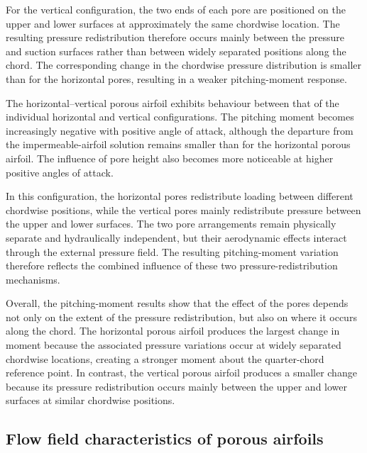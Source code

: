 \documentclass[a4paper,fleqn]{cas-dc}
\begin{document}
	For the vertical configuration, the two ends of each pore are positioned
	on the upper and lower surfaces at approximately the same chordwise
	location. The resulting pressure redistribution therefore occurs mainly
	between the pressure and suction surfaces rather than between widely
	separated positions along the chord. The corresponding change in the chordwise pressure distribution is
	smaller than for the horizontal pores, resulting in a weaker
	pitching-moment response.
	
	The horizontal--vertical porous airfoil exhibits behaviour between that
	of the individual horizontal and vertical configurations. The pitching
	moment becomes increasingly negative with positive angle of attack,
	although the departure from the impermeable-airfoil solution remains
	smaller than for the horizontal porous airfoil. The influence of pore
	height also becomes more noticeable at higher positive angles of attack.
	
	In this configuration, the horizontal pores redistribute loading
	between different chordwise positions, while the vertical pores mainly
	redistribute pressure between the upper and lower surfaces. The two pore
	arrangements remain physically separate and hydraulically independent,
	but their aerodynamic effects interact through the external pressure
	field. The resulting pitching-moment variation therefore reflects the
	combined influence of these two pressure-redistribution mechanisms.
	
	Overall, the pitching-moment results show that the effect of the pores
	depends not only on the extent of the pressure redistribution, but also
	on where it occurs along the chord. The horizontal porous airfoil
	produces the largest change in moment because the associated
	pressure variations occur at widely separated chordwise locations,
	creating a stronger moment about the quarter-chord reference point.
	In contrast, the vertical porous airfoil produces a smaller change
	because its pressure redistribution occurs mainly between the upper
	and lower surfaces at similar chordwise positions.
	
	
	
	\subsection{Flow field characteristics of porous airfoils}
	\label{subsec:flowfield_results}
	
\end{document}
